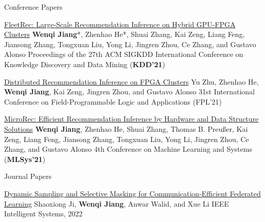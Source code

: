 \begin{rSection}{Conference Papers}
\begin{enumerate}[label={[\arabic*]}]
\item
\begin{Pub}{\href{https://dl.acm.org/doi/abs/10.1145/3447548.3467139?casa_token=KETIiL8HG6oAAAAA:rOygoffuHx-V_HjsNReM1ErnbH1AsOt6EJgp8odg7fUJHWhFb1c82hY0D4U8PoZf7G9TOP8QMToG2A}{FleetRec: Large-Scale Recommendation Inference on Hybrid GPU-FPGA Clusters}}
{\textbf{Wenqi Jiang}*, Zhenhao He*, Shuai Zhang, Kai Zeng, Liang Feng, Jiansong Zhang, Tongxuan Liu, Yong Li, Jingren Zhou, Ce Zhang, and Gustavo Alonso}
{Proceedings of the 27th ACM SIGKDD International Conference on Knowledge Discovery and Data Mining (\textbf{KDD'21})}
\end{Pub}

\item
\begin{Pub}{\href{https://ieeexplore.ieee.org/abstract/document/9556456?casa_token=i6-KNe_mgqQAAAAA:XVVQqTyccq7JC8hKFzoVbkwvpdTm544dKUPoEJEa13erbeNJc0WyqkLmgwIwscVQ8nQcYGx15JI}{Distributed Recommendation Inference on FPGA Clusters}}
{Yu Zhu, Zhenhao He, \textbf{Wenqi Jiang}, Kai Zeng, Jingren Zhou, and Gustavo Alonso}
{31st International Conference on Field-Programmable Logic and Applications (FPL'21)}
\end{Pub}

\item
\begin{Pub}{\href{https://proceedings.mlsys.org/paper_files/paper/2021/hash/9e9a5486cb2f8e44d5b5fedd2a9e5fcd-Abstract.html}{MicroRec: Efficient Recommendation Inference by Hardware and Data Structure Solutions}}
{\textbf{Wenqi Jiang}, Zhenhao He, Shuai Zhang, Thomas B. Preußer, Kai Zeng, Liang Feng, Jiansong Zhang, Tongxuan Liu, Yong Li, Jingren Zhou, Ce Zhang, and Gustavo Alonso}
{4th Conference on Machine Learning and Systems (\textbf{MLSys'21})}
\end{Pub}\end{enumerate}
\end{rSection}



\begin{rSection}{Journal Papers}
\begin{enumerate}[label={[\arabic*]}]

\item
\begin{Pub}{\href{https://ieeexplore.ieee.org/abstract/document/9546691}{Dynamic Sampling and Selective Masking for Communication-Efficient Federated Learning}}
{Shaoxiong Ji, \textbf{Wenqi Jiang}, Anwar Walid, and Xue Li}
{IEEE Intelligent Systems, 2022 }
\end{Pub}\end{enumerate}
\end{rSection}



